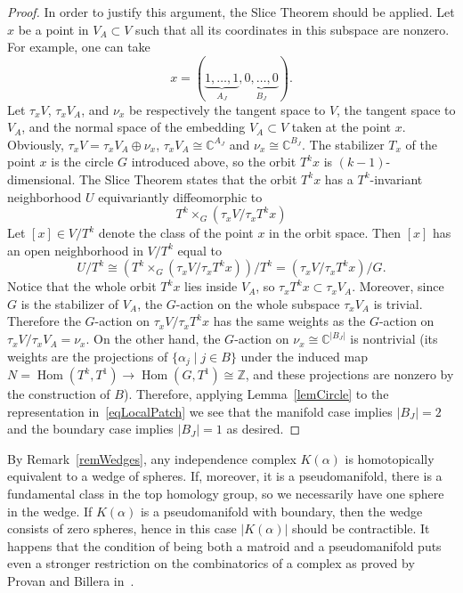 \documentclass[english,12pt,oneside]{amsproc}
\DeclareMathOperator{\Hom}{Hom} \DeclareMathOperator{\rk}{rk}
\newcommand{\Zo}{\mathbb{Z}}
\newcommand{\Co}{\mathbb{C}}
\numberwithin{equation}{section}
\theoremstyle{plain}
\theoremstyle{definition}
\theoremstyle{remark}
\begin{document}
\begin{proof}
In order to justify this argument, the Slice Theorem should be applied. Let $x$ be a point in $V_A\subset V$ such that all its coordinates in this subspace are nonzero. For example, one can take
\[
x=(\underbrace{1,\ldots,1}_{A_J},\underbrace{0,\ldots,0}_{B_J}).
\]
Let $\tau_xV$, $\tau_xV_A$, and $\nu_x$ be respectively the tangent space to $V$, the tangent space to $V_A$, and the normal space of the embedding $V_A\subset V$ taken at the point $x$. Obviously, $\tau_xV=\tau_xV_A\oplus \nu_x$, $\tau_xV_A\cong \Co^{A_J}$ and $\nu_x\cong\Co^{B_J}$. The stabilizer $T_x$ of the point $x$ is the circle $G$ introduced above, so the orbit $T^kx$ is $(k-1)$-dimensional. The Slice Theorem states that the orbit $T^kx$ has a $T^k$-invariant neighborhood $U$ equivariantly diffeomorphic to
\[
T^k\times_G(\tau_xV/\tau_xT^kx)
\]
Let $[x]\in V/T^k$ denote the class of the point $x$ in the orbit space. Then $[x]$ has an open neighborhood in $V/T^k$ equal to
\begin{equation}\label{eqLocalPatch}
U/T^k\cong (T^k\times_G(\tau_xV/\tau_xT^kx))/T^k=(\tau_xV/\tau_xT^kx)/G.
\end{equation}
Notice that the whole orbit $T^kx$ lies inside $V_A$, so $\tau_xT^kx\subset\tau_xV_A$. Moreover, since $G$ is the stabilizer of $V_A$, the $G$-action on the whole subspace $\tau_xV_A$ is trivial. Therefore the $G$-action on $\tau_xV/\tau_xT^kx$ has the same weights as the $G$-action on $\tau_xV/\tau_xV_A=\nu_x$. On the other hand, the $G$-action on $\nu_x\cong \Co^{|B_J|}$ is nontrivial (its weights are the projections of $\{\alpha_j\mid j\in B\}$ under the induced map $N=\Hom(T^k,T^1)\to \Hom(G,T^1)\cong \Zo$, and these projections are nonzero by the construction of $B$). Therefore, applying Lemma~\ref{lemCircle} to the representation in~\eqref{eqLocalPatch} we see that the manifold case implies $|B_J|=2$ and the boundary case implies $|B_J|=1$ as desired.
\end{proof}

By Remark~\ref{remWedges}, any independence complex $K(\alpha)$ is homotopically equivalent to a wedge of spheres. If, moreover, it is a pseudomanifold, there is a fundamental class in the top homology group, so we necessarily have one sphere in the wedge. If $K(\alpha)$ is a pseudomanifold with boundary, then the wedge consists of zero spheres, hence in this case $|K(\alpha)|$ should be contractible. It happens that the condition of being both a matroid and a pseudomanifold puts even a stronger restriction on the combinatorics of a complex as proved by Provan and Billera in~\cite{BilProv}.
\end{document}
